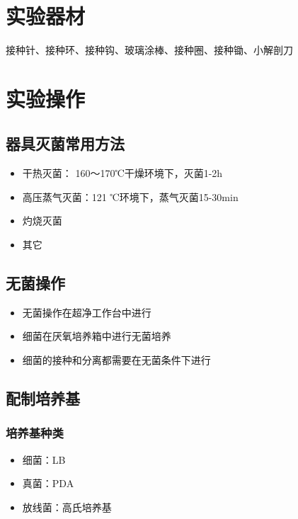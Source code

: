 \documentclass[UTF8]{article}
\begin{document}
    \section{实验器材}
    接种针、接种环、接种钩、玻璃涂棒、接种圈、接种锄、小解剖刀
    \section{实验操作}
    \subsection{器具灭菌常用方法}
    \begin{itemize}
        \item 干热灭菌： 160～170℃干燥环境下，灭菌1-2h
        \item 高压蒸气灭菌：121 ℃环境下，蒸气灭菌15-30min 
        \item 灼烧灭菌
        \item 其它
    \end{itemize}
    \subsection{无菌操作}
    \begin{itemize}
        \item 无菌操作在超净工作台中进行
        \item 细菌在厌氧培养箱中进行无菌培养
        \item 细菌的接种和分离都需要在无菌条件下进行
    \end{itemize}
    \subsection{配制培养基}
    \subsubsection{培养基种类}
    \begin{itemize}
        \item 细菌：LB
        \item 真菌：PDA
        \item 放线菌：高氏培养基
    \end{itemize}
\end{document}

